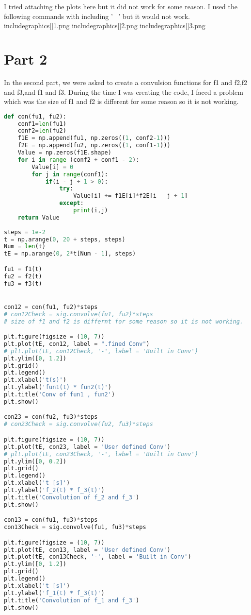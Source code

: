 \documentclass[12pt]{report}
\begin{document}
I tried attaching the plots here but it did not work for some reason. I used the following commands with including ' \ ' but it would not work.
includegraphics[]{1.png}
includegraphics[]{2.png}
includegraphics[]{3.png}

\section{Part 2 }

In the second part, we were asked to create a convulsion functions for f1 and f2,f2 and f3,and f1 and f3. During the time I was creating the code, I faced a problem which was the size of f1 and f2 is different for some reason so it is not working.

\begin{lstlisting}[language=Python]
def con(fu1, fu2):
    conf1=len(fu1)
    conf2=len(fu2)
    f1E = np.append(fu1, np.zeros((1, conf2-1)))
    f2E = np.append(fu2, np.zeros((1, conf1-1)))
    Value = np.zeros(f1E.shape)
    for i in range (conf2 + conf1 - 2):
        Value[i] = 0
        for j in range(conf1):
            if(i - j + 1 > 0):
                try:
                    Value[i] += f1E[i]*f2E[i - j + 1]
                except:
                    print(i,j)
    return Value
                  
steps = 1e-2
t = np.arange(0, 20 + steps, steps)
Num = len(t)
tE = np.arange(0, 2*t[Num - 1], steps)

fu1 = f1(t)
fu2 = f2(t)
fu3 = f3(t)


con12 = con(fu1, fu2)*steps
# con12Check = sig.convolve(fu1, fu2)*steps
# size of f1 and f2 is differnt for some reason so it is not working.

plt.figure(figsize = (10, 7))
plt.plot(tE, con12, label = ".fined Conv")
# plt.plot(tE, con12Check, '-', label = 'Built in Conv')
plt.ylim([0, 1.2])
plt.grid()
plt.legend()
plt.xlabel('t(s)')
plt.ylabel('fun1(t) * fun2(t)')
plt.title('Conv of fun1 , fun2')
plt.show()

con23 = con(fu2, fu3)*steps
# con23Check = sig.convolve(fu2, fu3)*steps

plt.figure(figsize = (10, 7))
plt.plot(tE, con23, label = 'User defined Conv')
# plt.plot(tE, con23Check, '-', label = 'Built in Conv')
plt.ylim([0, 0.2])
plt.grid()
plt.legend()
plt.xlabel('t [s]')
plt.ylabel('f_2(t) * f_3(t)')
plt.title('Convolution of f_2 and f_3')
plt.show()

con13 = con(fu1, fu3)*steps
con13Check = sig.convolve(fu1, fu3)*steps

plt.figure(figsize = (10, 7))
plt.plot(tE, con13, label = 'User defined Conv')
plt.plot(tE, con13Check, '-', label = 'Built in Conv')
plt.ylim([0, 1.2])
plt.grid()
plt.legend()
plt.xlabel('t [s]')
plt.ylabel('f_1(t) * f_3(t)')
plt.title('Convolution of f_1 and f_3')
plt.show()

\end{lstlisting}
\end{document}
